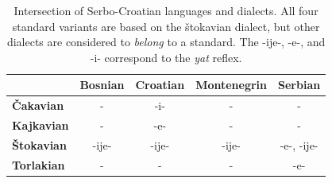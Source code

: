 \begin{table}
\centering
\begin{tabular}{lcccc}
  \hline
              &  \textbf{Bosnian} & \textbf{Croatian} & \textbf{Montenegrin} & \textbf{Serbian}\\
  \hline
 \textbf{Čakavian}  & - & -i- & - & -  \\
 \textbf{Kajkavian}  & - & -e- & - & -  \\
 \textbf{Štokavian}  & -ije- & -ije- & -ije- & -e-, -ije-  \\
 \textbf{Torlakian}  & - & - & - & -e-  \\
\hline
\end{tabular}
\caption{Intersection of Serbo-Croatian languages and dialects. All four standard variants 
  are based on the štokavian dialect, but other dialects are considered to \emph{belong} to a 
  standard. The -ije-, -e-, and -i- correspond to the \emph{yat} reflex.}
\end{table}




